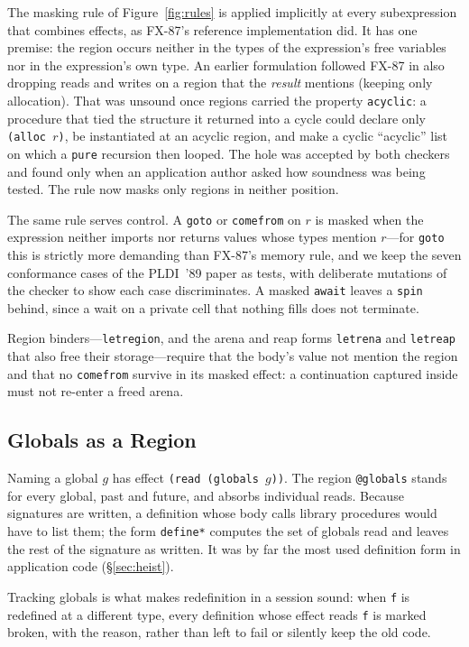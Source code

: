 \documentclass[acmsmall,screen,review]{acmart}
\newcommand{\cd}[1]{\texttt{#1}}
\begin{document}
The masking rule of Figure~\ref{fig:rules} is applied implicitly at
every subexpression that combines effects, as FX-87's reference
implementation did. It has one premise: the region occurs neither in
the types of the expression's free variables nor in the expression's
own type. An earlier formulation followed FX-87 in also dropping reads
and writes on a region that the \emph{result} mentions (keeping only
allocation). That was unsound once regions carried the property
\cd{acyclic}: a procedure that tied the structure it returned into a
cycle could declare only \cd{(alloc $r$)}, be instantiated at an
acyclic region, and make a cyclic ``acyclic'' list on which a \cd{pure}
recursion then looped. The hole was accepted by both checkers and found
only when an application author asked how soundness was being tested.
The rule now masks only regions in neither position.

The same rule serves control. A \cd{goto} or \cd{comefrom} on $r$ is
masked when the expression neither imports nor returns values whose
types mention $r$---for \cd{goto} this is strictly more demanding than
FX-87's memory rule, and we keep the seven conformance cases of the
PLDI~'89 paper as tests, with deliberate mutations of the checker to
show each case discriminates. A masked \cd{await} leaves a \cd{spin}
behind, since a wait on a private cell that nothing fills does not
terminate.

Region binders---\cd{letregion}, and the arena and reap forms
\cd{letrena} and \cd{letreap} that also free their storage---require
that the body's value not mention the region and that no \cd{comefrom}
survive in its masked effect: a continuation captured inside must not
re-enter a freed arena.

\subsection{Globals as a Region}

Naming a global $g$ has effect \cd{(read (globals $g$))}. The region
\cd{@globals} stands for every global, past and future, and absorbs
individual reads. Because signatures are written, a definition whose
body calls library procedures would have to list them; the form
\cd{define*} computes the set of globals read and leaves the rest of
the signature as written. It was by far the most used definition form
in application code (\S\ref{sec:heist}).

Tracking globals is what makes redefinition in a session sound: when
\cd{f} is redefined at a different type, every definition whose effect
reads \cd{f} is marked broken, with the reason, rather than left to
fail or silently keep the old code.
\end{document}
